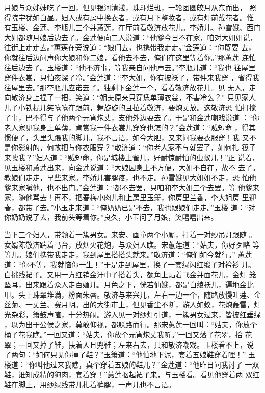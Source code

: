 月娘与众姊妹吃了一回，但见银河清浅，珠斗烂斑，一轮团圆皎月从东而出，
照得院宇犹如白昼。妇人或有房中换衣者，或有月下整妆者，或有灯前戴花者。惟
有玉楼、金莲、李瓶儿三个并蕙莲，在厅前看敬济放花儿。李娇儿、孙雪娥、西门
大姐都随月娘后边去了。金莲便向二人说道：“他爹今日不在家，咱对大姐姐说，
往街上走走去。”蕙莲在旁说道：“娘们去，也携带我走走。”金莲道：“你既要
去，你就往后边问声你大娘和你二娘，看他去不去，俺们在这里等着你。”那蕙莲
连忙往后边去了。玉楼道：“他不济事，等我亲自问他声去。”李瓶儿道：“我也
往屋里穿件衣裳，只怕夜深了冷。”金莲道：“李大姐，你有披袄子，带件来我穿
，省得我往屋里去。”那李瓶儿应诺去了。独剩下金莲一个，看着敬济放花儿。见
无人，走向敬济身上捏了一把，笑道：“姐夫原来只穿恁单薄衣裳，不害冷么？”
只见家人儿子小铁棍儿笑嘻嘻在跟前，舞旋旋的且拉着敬济，要炮丈放。这敬济恐
怕打搅了事，巴不得与了他两个元宵炮丈，支他外边耍去了。于是和金莲嘲戏说道
：“你老人家见我身上单薄，肯赏我一件衣裳儿穿穿也怎的？”金莲道：“贼短命
，得其惯便了，头里头蹑我的脚儿，我不言语，如今大胆，又来问我要衣服穿！我
又不是你影射的，何故把与你衣服穿？”敬济道：“你老人家不与就罢了，如何扎
筏子来唬我？”妇人道：“贼短命，你是城楼上雀儿，好耐惊耐怕的虫蚁儿！”正
说着，见玉楼和蕙莲出来，向金莲说道：“大娘因身上不方便，大姐不自在，故不
去了。教娘们走走，早些来家。李娇儿害腿疼，也不走。孙雪娥见大姐姐不走，恐
怕他爹来家嗔他，也不出门。”金莲道：“都不去罢，只咱和李大姐三个去罢。等
他爹来家，随他骂去！再不，把春梅小肉儿和上房里玉箫，你房里兰香，李大姐房
里迎春，都带了去。”小玉走来道：“俺奶奶已是不去，我也跟娘们走走。”玉楼
道：“对你奶奶说了去，我前头等着你。”良久，小玉问了月娘，笑嘻嘻出来。

当下三个妇人，带领着一簇男女。来安、画童两个小厮，打着一对纱吊灯跟随
。女婿陈敬济踹着马台，放烟火花炮，与众妇人瞧。宋蕙莲道：“姑夫，你好歹略
等等儿。娘们携带我走走，我到屋里搭搭头就来。”敬济道：“俺们如今就行。”
蕙莲道：“你不等，我就恼你一生！”于是走到屋里，换了一套绿闪红缎子对衿衫
儿、白挑线裙子。又用一方红销金汗巾子搭着头，额角上贴着飞金并面花儿，金灯
笼坠耳，出来跟着众人走百媚儿。月色之下，恍若仙娥，都是白绫袄儿，遍地金比
甲。头上珠翠堆满，粉面朱唇。敬济与来兴儿，左右一边一个，随路放慢吐莲、金
丝菊、一丈兰、赛月明。出的大街市上，但见香尘不断，游人如蚁，花炮轰雷，灯
光杂彩，箫鼓声喧，十分热闹。游人见一对纱灯引道，一簇男女过来，皆披红垂绿
，以为出于公侯之家，莫敢仰视，都躲路而行。那宋蕙莲一回叫：“姑夫，你放个
桶子花我瞧。”一回又道：“姑夫，你放个元宵炮丈我听。”一回又落了花翠，拾
花翠；一回又掉了鞋，扶着人且兜鞋；左来右去，只和敬济嘲戏。玉楼看不上，说
了两句：“如何只见你掉了鞋？”玉箫道：“他怕地下泥，套着五娘鞋穿着哩！”
玉楼道：“你叫他过来我瞧，真个穿着五娘的鞋儿？”金莲道：“他昨日问我讨了
一双鞋，谁知成精的狗肉，套着穿！”蕙莲抠起裙子来，与玉楼看。看见他穿着两
双红鞋在脚上，用纱绿线带儿扎着裤腿，一声儿也不言语。

